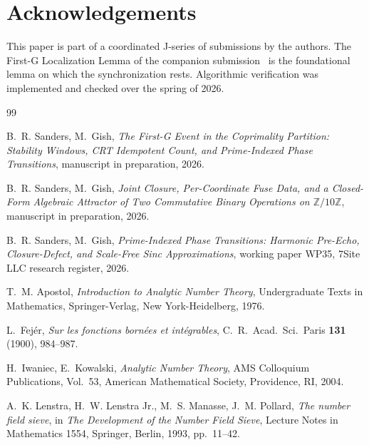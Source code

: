 \documentclass[11pt,reqno]{amsart}
\theoremstyle{plain}
\theoremstyle{definition}
\theoremstyle{remark}
\newcommand{\Z}{\mathbb{Z}}
\begin{document}
\section*{Acknowledgements}

This paper is part of a coordinated J-series of submissions by
the authors. The First-G Localization Lemma of the companion
submission~\cite{J04Sanders} is the foundational lemma on which
the synchronization rests. Algorithmic verification was
implemented and checked over the spring of 2026.

\begin{thebibliography}{99}

B.~R. Sanders, M.~Gish, \emph{The First-G Event in the
Coprimality Partition: Stability Windows, CRT Idempotent Count,
and Prime-Indexed Phase Transitions}, manuscript in preparation,
2026.

B.~R. Sanders, M.~Gish, \emph{Joint Closure, Per-Coordinate Fuse
Data, and a Closed-Form Algebraic Attractor of Two Commutative
Binary Operations on $\Z/10\Z$}, manuscript in preparation, 2026.

B.~R. Sanders, M.~Gish, \emph{Prime-Indexed Phase Transitions:
Harmonic Pre-Echo, Closure-Defect, and Scale-Free Sinc
Approximations}, working paper WP35, 7Site LLC research
register, 2026.

T.~M. Apostol, \emph{Introduction to Analytic Number Theory},
Undergraduate Texts in Mathematics, Springer-Verlag, New York-Heidelberg,
1976.

L.~Fej\'er, \emph{Sur les fonctions born\'ees et int\'egrables},
C.~R.~Acad.~Sci.\ Paris \textbf{131} (1900), 984--987.

H.~Iwaniec, E.~Kowalski, \emph{Analytic Number Theory}, AMS
Colloquium Publications, Vol.\ 53, American Mathematical Society,
Providence, RI, 2004.

A.~K. Lenstra, H.~W. Lenstra Jr., M.~S. Manasse, J.~M. Pollard,
\emph{The number field sieve}, in \emph{The Development of the
Number Field Sieve}, Lecture Notes in Mathematics 1554,
Springer, Berlin, 1993, pp.~11--42.


\end{thebibliography}
\end{document}
